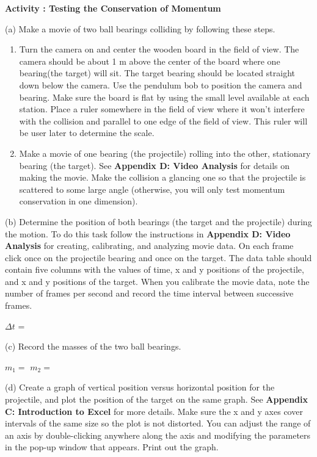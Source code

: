 \textbf{Activity  : Testing the Conservation of Momentum }

(a) Make a movie of two ball bearings colliding by following these steps. 

\begin{enumerate}
\item Turn the camera on and center the wooden board in the field of view. The camera
should be about 1 m above the center of the board where one bearing(the target)
will sit. The target bearing should be located straight down below the camera.
Use the pendulum bob to position the camera and bearing. Make sure the board
is flat by using the small level available at each station. Place a ruler somewhere
in the field of view where it won't interfere with the collision and parallel
to one edge of the field of view. This ruler will be user later to determine
the scale. 
\item Make a movie of one bearing (the projectile) rolling into the other, stationary
bearing (the target). See \textbf{Appendix D: Video Analysis} for details on
making the movie. Make the collision a glancing one so that the projectile is
scattered to some large angle (otherwise, you will only test momentum conservation
in one dimension).
\end{enumerate}
(b) Determine the position of both bearings (the target and the projectile)
during the motion. To do this task follow the instructions in \textbf{Appendix
D: Video Analysis} for creating, calibrating, and analyzing movie data. On each
frame click once on the projectile bearing and once on the target. The data
table should contain five columns with the values of time, x and y positions
of the projectile, and x and y positions of the target. When you calibrate the
movie data, note the number of frames per second and record the time interval
between successive frames.
\vspace{5mm}

\( \Delta  t\) = 
\vspace{5mm}

(c) Record the masses of the two ball bearings.
\vspace{5mm}

\( m_{1} =\)  \hfill{}\( m_{2} =\)  \hfill{}
\vspace{5mm}

(d) Create a graph of vertical position versus horizontal position for the projectile, and plot the position of the target on the same graph.
See \textbf{Appendix C: Introduction to Excel} for more details. Make
sure the x and y axes cover intervals of the same size so the plot is not distorted.
You can adjust the range of an axis by double-clicking anywhere along the axis
and modifying the parameters in the pop-up window that appears. 
Print out the graph.

